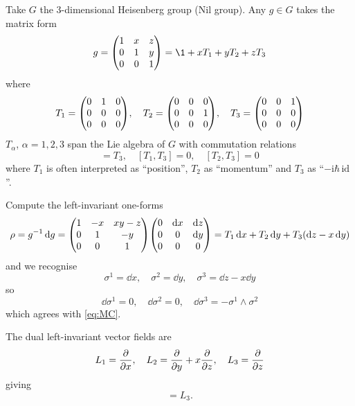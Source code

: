\documentclass[a4paper,11pt]{article}
\begin{document}
    \begin{ex}
        Take $G$ the 3-dimensional Heisenberg group (Nil group). Any $g \in G$ takes the matrix form 
        \begin{equation}
            g = \mqty(1 & x & z\\0 & 1 & y\\0 & 0 & 1) = \1 + x T_1 + y T_2 + z T_3
        \end{equation}
        where 
        \begin{equation}
            T_1 = \mqty(0 & 1 & 0\\0 & 0 &0\\0 & 0 & 0), \quad T_2 = \mqty(0 & 0 & 0\\0 & 0 &1\\0 & 0 & 0), \quad T_3 = \mqty(0 & 0 & 1\\0 & 0 &0\\0 & 0 & 0)
        \end{equation}
        $T_\alpha$, $\alpha = 1,2,3$ span the Lie algebra of $G$ with commutation relations 
        \begin{equation}
            [T_1, T_2] = T_3, \quad [T_1, T_3] = 0, \quad [T_2, T_3] = 0
        \end{equation}
        where $T_1$ is often interpreted as ``position'', $T_2$ as ``momentum'' and $T_3$ as ``$-\mathrm{i} \hbar\,\text{id}$''.

        Compute the left-invariant one-forms
        \begin{equation}
            \rho = g^{-1} \dd{g} = \mqty(1 & - x & xy-z\\0 & 1 & -y\\0 & 0 & 1) \mqty(0 & \dd{x} & \dd{z}\\0 & 0 & \dd{y}\\0 & 0 & 0) = T_1 \dd{x} + T_2 \dd{y} + T_3 (\dd{z} - x \dd{y})
        \end{equation}
        and we recognise 
        \begin{equation}
            \sigma^1 = \dd{x}, \quad \sigma^2 = \dd{y}, \quad \sigma^3 = \dd{z} - x \dd{y}
        \end{equation}
        so 
        \begin{equation}
            \dd{\sigma^1} = 0, \quad \dd{\sigma^2} = 0, \quad \dd{\sigma^3} = - \sigma^1 \wedge \sigma^2
        \end{equation}
        which agrees with \eqref{eq:MC}.

        The dual left-invariant vector fields are 
        \begin{equation}
            L_1 = \pdv{x}, \quad L_2 = \pdv{y} + x \pdv{z}, \quad L_3 = \pdv{z}
        \end{equation}
        giving 
        \begin{equation}
            [L_1,L_2] = L_3.
        \end{equation}
    \end{ex}
\end{document}
